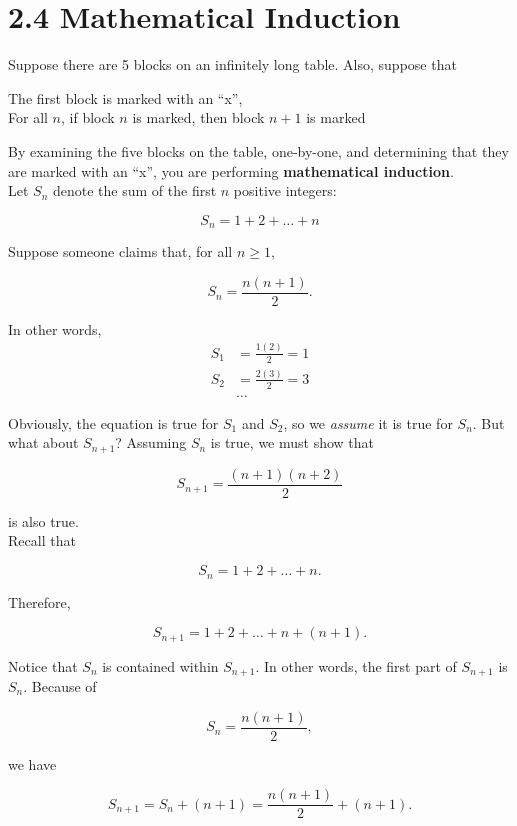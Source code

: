 \section*{2.4 Mathematical Induction}

Suppose there are 5 blocks on an infinitely long table.  Also, suppose that
\begin{center}
    The first block is marked with an ``x'',\\
    For all $n$, if block $n$ is marked, then block $n + 1$ is marked
\end{center}

By examining the five blocks on the table, one-by-one, and determining that they are marked with an ``x'', you are performing \textbf{mathematical induction}.\\

Let $S_n$ denote the sum of the first $n$ positive integers:

\[
    S_n = 1 + 2 + \dots + n
\]

Suppose someone claims that, for all $n \geq 1$,

\[
    S_n = \frac{n(n + 1)}{2}.
\]

In other words,
\begin{align*}
    S_1 &= \frac{1(2)}{2} = 1\\
    S_2 &= \frac{2(3)}{2} = 3\\
    &\dots
\end{align*}

Obviously, the equation is true for $S_1$ and $S_2$, so we \textit{assume} it is true for $S_n$.  But what about $S_{n + 1}$?  Assuming $S_n$ is true, we must show that 

\[
    S_{n + 1} = \frac{(n + 1)(n + 2)}{2}
\]

is also true.\\

Recall that

\[
    S_n = 1 + 2 + \dots + n.
\]

Therefore,

\[
    S_{n + 1} = 1 + 2 + \dots + n + (n + 1).
\]

Notice that $S_n$ is contained within $S_{n + 1}$.  In other words, the first part of $S_{n + 1}$ is $S_n$.  Because of

\[
    S_n = \frac{n(n + 1)}{2},
\]

we have

\[
    S_{n + 1} = S_n + (n + 1) = \frac{n(n + 1)}{2} + (n + 1).
\]

